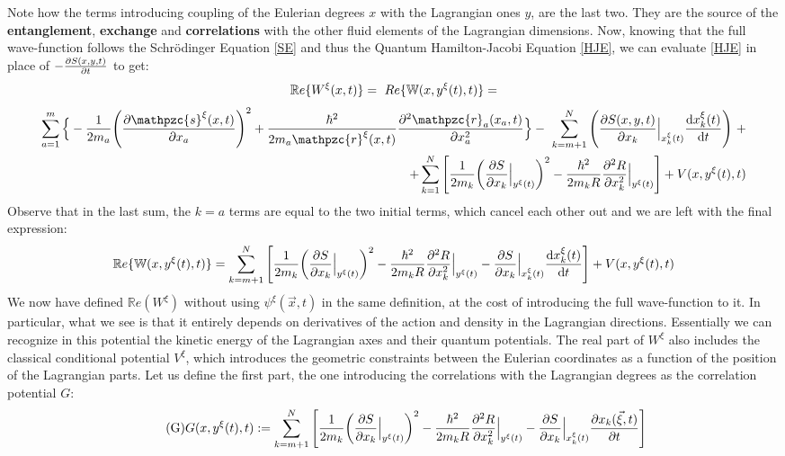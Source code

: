 \documentclass[11pt, a4paper]{article} %
\newcommand{\R}{\mathbb{R}} %
\newcommand{\z}{\mathpzc{s}}
\newcommand{\p}{\mathpzc{r}}
\newcommand{\W}{\mathbb{W}}
\begin{document}
Note how the terms introducing coupling of the Eulerian degrees $x$ with the Lagrangian ones $y$, are the last two. They are the source of the {\bf entanglement}, {\bf exchange} and {\bf correlations} with the other fluid elements of the Lagrangian dimensions. Now, knowing that the full wave-function follows the Schrödinger Equation \eqref{SE} and thus the Quantum Hamilton-Jacobi Equation \eqref{HJE}, we can evaluate \eqref{HJE} in place of $-\pdv{S(x,y,t)}{t}$ to get:\vspace{-0.2cm}
$$
\R e\{W^\xi(x,t)\}=\ Re\{\W(x, y^\xi(t),t)\}=\vspace{-0.14cm}
$$
\begin{equation*}
\begin{split}
\sum_{a=1}^m\Big\{-\frac{1}{2m_a} \qty(\pdv{\z^\xi(x,t)}{x_a})^2 +\frac{\hbar^2}{2m_a\p^\xi(x,t)}\pdv[2]{\p_a(x_a, t)}{x_a}\Big\}- \ \sum_{k=m+1}^N \qty( \pdv{S(x,y,t)}{x_k}\Big\rvert_{x_k^\xi(t)} \dv{x_k^\xi(t)}{t})\ + \\ \ +\sum_{k=1}^N \qty[\frac{1}{2m_k} \qty(\pdv{S}{x_k}\Big\rvert_{y^\xi(t)})^2 -\frac{\hbar^2}{2m_kR}\pdv[2]{R}{x_k}\Big\rvert_{y^\xi(t)} ] + V(x, y^\xi(t),t)
\end{split}
\end{equation*}
Observe that in the last sum, the $k=a$ terms are equal to the two initial terms, which cancel each other out and we are left with the final expression:\vspace{-0.3cm}\label{ReW}
\begin{equation*}
\R e\{\W(x, y^\xi(t),t)\}= \sum_{k=m+1}^N \qty[\frac{1}{2m_k} \qty(\pdv{S}{x_k}\Big\rvert_{y^\xi(t)})^2 -\frac{\hbar^2}{2m_kR}\pdv[2]{R}{x_k}\Big\rvert_{y^\xi(t)} -\pdv{S}{x_k}\Big\rvert_{x_k^\xi(t)} \dv{x_k^\xi(t)}{t} ] + V(x, y^\xi(t),t)
\end{equation*}
We now have defined $\R e(W^\xi)$ without using $\psi^\xi(\vec{x},t)$ in the same definition, at the cost of introducing the full wave-function to it. In particular, what we see is that it entirely depends on derivatives of the action and density in the Lagrangian directions. Essentially we can recognize in this potential the kinetic energy of the Lagrangian axes and their quantum potentials. The real part of $W^\xi$ also includes the classical conditional potential $V^\xi$, which introduces the geometric constraints between the Eulerian coordinates as a function of the position of the Lagrangian parts. Let us define the first part, the one introducing the correlations with the Lagrangian degrees as the correlation potential $G$:
\begin{equation}\label{G}\tag{G}
G(x, y^\xi(t),t):=  \sum_{k=m+1}^N \qty[\frac{1}{2m_k} \qty(\pdv{S}{x_k}\Big\rvert_{y^\xi(t)})^2 -\frac{\hbar^2}{2m_kR}\pdv[2]{R}{x_k}\Big\rvert_{y^\xi(t)} -\pdv{S}{x_k}\Big\rvert_{x_k^\xi(t)} \pdv{x_k(\vec{\xi},t)}{t} ]
\end{equation}
\end{document}
